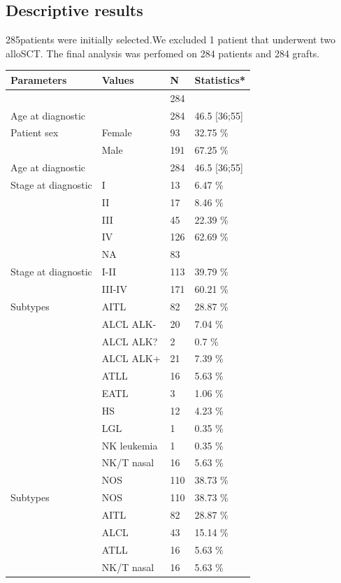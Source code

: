 \documentclass[a4paper,11pt] {article}
\begin{document}
\subsection{Descriptive results}
 285patients were initially selected.We excluded 1 patient that underwent two alloSCT. The final analysis was perfomed on 284 patients and 284 grafts.
\begin{longtable}{llll}
  \hline
Parameters & Values & N & Statistics* \\ 
  \hline
 &  & 284 &  \\ 
  Age at diagnostic &  & 284 & 46.5 [36;55] \\ 
  Patient sex & Female & 93 & 32.75 \% \\ 
   & Male & 191 & 67.25 \% \\ 
  Age at diagnostic &  & 284 & 46.5 [36;55] \\ 
  Stage at diagnostic & I & 13 & 6.47 \% \\ 
   & II & 17 & 8.46 \% \\ 
   & III & 45 & 22.39 \% \\ 
   & IV & 126 & 62.69 \% \\ 
   & NA & 83 &  \\ 
  Stage at diagnostic & I-II & 113 & 39.79 \% \\ 
   & III-IV & 171 & 60.21 \% \\ 
  Subtypes & AITL & 82 & 28.87 \% \\ 
   & ALCL ALK- & 20 & 7.04 \% \\ 
   & ALCL ALK? & 2 & 0.7 \% \\ 
   & ALCL ALK+ & 21 & 7.39 \% \\ 
   & ATLL & 16 & 5.63 \% \\ 
   & EATL & 3 & 1.06 \% \\ 
   & HS & 12 & 4.23 \% \\ 
   & LGL & 1 & 0.35 \% \\ 
   & NK leukemia & 1 & 0.35 \% \\ 
   & NK/T nasal & 16 & 5.63 \% \\ 
   & NOS & 110 & 38.73 \% \\ 
  Subtypes & NOS & 110 & 38.73 \% \\ 
   & AITL & 82 & 28.87 \% \\ 
   & ALCL & 43 & 15.14 \% \\ 
   & ATLL & 16 & 5.63 \% \\ 
   & NK/T nasal & 16 & 5.63 \% \\ 

\end{longtable}
\end{document}
